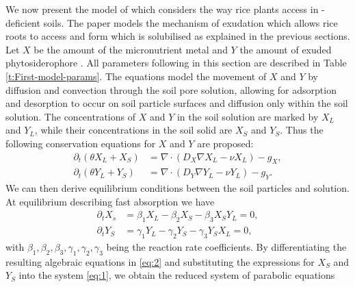 \documentclass[11pt]{article}
\numberwithin{equation}{section}
\begin{document}
We now present the model of \cite{Ptashnyk-2011} which considers the way rice plants access  in -deficient soils. The paper models the mechanism of  exudation which allows rice roots to access  and form  which is solubilised as explained in the previous sections. Let $X$ be the amount of the micronutrient metal  and $Y$ the amount of exuded phytosiderophore . All parameters following in this section are described in Table \ref{t:First-model-params}. 
The equations model the movement of $X$ and $Y$ by diffusion and convection through the soil pore solution, allowing for adsorption and desorption to occur on soil particle surfaces and diffusion only within the soil solution. 
The concentrations of $X$ and $Y$ in the soil solution are marked by $X_L$ and $Y_L$, while their concentrations in the soil solid are $X_S$ and $Y_S$.
Thus the following conservation equations for $X$ and $Y$ are proposed:
\begin{equation}
\begin{aligned}
    \partial_t(\theta X_L+X_S)&=\nabla \cdot (D_X\nabla X_L-\nu X_L)-g_X,\\
    \partial_t(\theta Y_L+Y_S)&=\nabla \cdot (D_Y\nabla Y_L-\nu Y_L)-g_Y.
    \label{eq:1}
\end{aligned}
\end{equation}
We can then derive equilibrium conditions between the soil particles and solution. %
At equilibrium describing fast absorption we have
\begin{equation}
    \begin{aligned}
        \partial_t X_s&=\beta_1X_L-\beta_2X_S-\beta_3X_SY_L=0,\\
        \partial_t Y_S&=\gamma_1Y_L-\gamma_2Y_S-\gamma_3Y_SX_L=0,
    \end{aligned}
    \label{eq:2}
\end{equation}
with $\beta_1,\beta_2,\beta_3,\gamma_1,\gamma_2,\gamma_3$ being the reaction rate coefficients.
By differentiating the resulting algebraic equations in \eqref{eq:2} and substituting the expressions for $X_S$ and $Y_S$ into the system \eqref{eq:1}, we obtain the reduced system of parabolic equations
\end{document}
